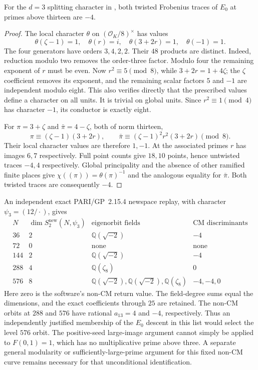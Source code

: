 \begin{lemma}
\label{bs-character-sign}
For the $d=3$ splitting character in
\cite[Table~3.3 and the following definition]{PacettiVillagra2022QCurves},
both twisted Frobenius traces of $E_0$ at primes above thirteen are
$-4$.
\end{lemma}
\begin{proof}
The local character $\theta$ on $(\mathcal O_K/8)^\times$ has values
\[
 \theta(\zeta-1)=1,\quad \theta(r)=i,\quad
 \theta(3+2r)=1,\quad \theta(-1)=1.
\]
The four generators have orders $3,4,2,2$. Their $48$ products are
distinct. Indeed, reduction modulo two removes the order-three
factor. Modulo four the remaining exponent of $r$ must be even.
Now $r^2\equiv5\pmod8$, while $3+2r=1+4\zeta$; the $\zeta$
coefficient removes its exponent, and the remaining scalar factors
$5$ and $-1$ are independent modulo eight. This also verifies directly
that the prescribed values define a character on all units. It is
trivial on global units. Since $r^2\equiv1\pmod4$ has character
$-1$, its conductor is exactly eight.

For $\pi=3+\zeta$ and $\bar\pi=4-\zeta$, both of norm thirteen,
\[
 \pi\equiv(\zeta-1)(3+2r),\qquad
 \bar\pi\equiv(\zeta-1)^2r^2(3+2r)\pmod8.
\]
Their local character values are therefore $1,-1$. At the associated
primes $r$ has images $6,7$ respectively. Full point counts give
$18,10$ points, hence untwisted traces $-4,4$ respectively. Global
principality and the absence of other ramified finite places give
$\chi((\pi))=\theta(\pi)^{-1}$ and the analogous equality for
$\bar\pi$. Both twisted traces are consequently $-4$.
\end{proof}

An independent exact PARI/GP~2.15.4 newspace replay, with character
$\psi_3=(12/\cdot)$, gives
\[
\begin{array}{c|r|l|l}
 N&\dim S_2^{\mathrm{new}}(N,\psi_3)&
       \text{eigenorbit fields}&\text{CM discriminants}\\\hline
 36&2&\mathbb Q(\sqrt{-2})&-4\\
 72&0&\text{none}&\text{none}\\
 144&2&\mathbb Q(\sqrt{-2})&-4\\
 288&4&\mathbb Q(\zeta_8)&0\\
 576&8&\mathbb Q(\sqrt{-2}),\mathbb Q(\sqrt{-2}),
          \mathbb Q(\zeta_8)&-4,-4,0
\end{array}
\]
Here zero is the software's non-CM return value. The field-degree
sums equal the dimensions, and the exact coefficients through $25$
are retained. The non-CM orbits at $288$ and $576$ have rational
$a_{13}=4$ and $-4$, respectively. Thus an independently justified
membership of the $E_0$ descent in this list would select the level
$576$ orbit. The positive-seed large-image argument cannot simply
be applied to $F(0,1)=1$, which has no multiplicative prime above
three. A separate general modularity or sufficiently-large-prime
argument for this fixed non-CM curve remains necessary for that
unconditional identification.


